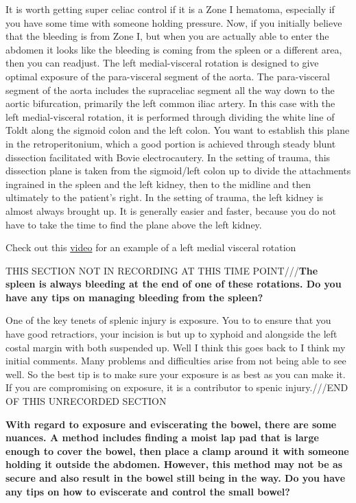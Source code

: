\documentclass[
]{book}
\begin{document}
It is worth getting super celiac control if it is a Zone I hematoma,
especially if you have some time with someone holding pressure. Now, if
you initially believe that the bleeding is from Zone I, but when you are
actually able to enter the abdomen it looks like the bleeding is coming
from the spleen or a different area, then you can readjust. The left
medial-visceral rotation is designed to give optimal exposure of the
para-visceral segment of the aorta. The para-visceral segment of the
aorta includes the supraceliac segment all the way down to the aortic
bifurcation, primarily the left common iliac artery. In this case with
the left medial-visceral rotation, it is performed through dividing the
white line of Toldt along the sigmoid colon and the left colon. You want
to establish this plane in the retroperitonium, which a good portion is
achieved through steady blunt dissection facilitated with Bovie
electrocautery. In the setting of trauma, this dissection plane is taken
from the sigmoid/left colon up to divide the attachments ingrained in
the spleen and the left kidney, then to the midline and then ultimately
to the patient's right. In the setting of trauma, the left kidney is
almost always brought up. It is generally easier and faster, because you
do not have to take the time to find the plane above the left kidney.

Check out this \href{https://www.youtube.com/watch?v=DPxiDYzJwcY}{video} for an example of a left medial visceral rotation

THIS SECTION NOT IN RECORDING AT THIS TIME POINT///\textbf{The spleen is
always bleeding at the end of one of these rotations. Do you have any
tips on managing bleeding from the spleen?}

One of the key tenets of splenic injury is exposure. You to to ensure
that you have good retractiors, your incision is but up to xyphoid and
alongside the left costal margin with both suspended up. Well I think
this goes back to I think my initial comments. Many problems and
difficulties arise from not being able to see well. So the best tip is
to make sure your exposure is as best as you can make it. If you are
compromising on exposure, it is a contributor to spenic injury.///END OF
THIS UNRECORDED SECTION

\textbf{With regard to exposure and eviscerating the bowel, there are some
nuances. A method includes finding a moist lap pad that is large enough
to cover the bowel, then place a clamp around it with someone holding it
outside the abdomen. However, this method may not be as secure and also
result in the bowel still being in the way. Do you have any tips on how
to eviscerate and control the small bowel?}
\end{document}
